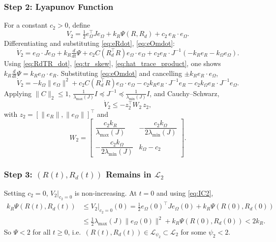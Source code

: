 \documentclass[11pt]{article}
\theoremstyle{remark}
\newcommand{\lmin}{\lambda_{\min}}
\newcommand{\lmax}{\lambda_{\max}}
\begin{document}
\subsubsection*{Step 2: Lyapunov Function}
For a constant $c_2 > 0$, define
\begin{equation}
V_2 = \tfrac{1}{2}e_\Omega^\top J e_\Omega + k_R \Psi(R, R_d) + c_2\, e_R \cdot e_\Omega.
\label{eq:V2}
\end{equation}
Differentiating and substituting \eqref{eq:eRdot}, \eqref{eq:eOmdot}:
\[
\dot V_2 = e_\Omega\cdot J\dot e_\Omega + k_R\tfrac{d}{dt}\Psi + c_2 C(R_d^\top R)e_\Omega\cdot e_\Omega + c_2 e_R \cdot J^{-1}(-k_R e_R - k_\Omega e_\Omega).
\]
Using \eqref{eq:RdTR_dot}, \eqref{eq:tr_skew}, \eqref{eq:hat_trace_product}, one shows $k_R \tfrac{d}{dt}\Psi = k_R e_\Omega\cdot e_R$. Substituting \eqref{eq:eOmdot} and cancelling $\pm k_R e_R\cdot e_\Omega$,
\begin{equation}
\dot V_2 = -k_\Omega\|e_\Omega\|^2 + c_2 C(R_d^\top R)e_\Omega\cdot e_\Omega - c_2 k_R e_R\cdot J^{-1}e_R - c_2 k_\Omega e_R\cdot J^{-1}e_\Omega.
\label{eq:V2dot_exact}
\end{equation}
Applying $\|C\|_2\le 1$, $\tfrac{1}{\lmax(J)}I \preceq J^{-1} \preceq \tfrac{1}{\lmin(J)}I$, and Cauchy--Schwarz,
\begin{equation}
\dot V_2 \le -z_2^\top W_2\, z_2,
\label{eq:V2dot}
\end{equation}
with $z_2 = [\|e_R\|,\|e_\Omega\|]^\top$ and
\[
W_2 = \begin{bmatrix}
    \dfrac{c_2 k_R}{\lmax(J)} & -\dfrac{c_2 k_\Omega}{2\lmin(J)} \\[8pt]
    -\dfrac{c_2 k_\Omega}{2\lmin(J)} & k_\Omega - c_2
\end{bmatrix}.
\]

\subsubsection*{Step 3: $(R(t), R_d(t))$ Remains in $\mathcal{L}_2$}
Setting $c_2 = 0$, $V_2|_{c_2=0}$ is non-increasing. At $t=0$ and using \eqref{eq:IC2},
\begin{align*}
k_R\Psi(R(t), R_d(t))
&\le V_2|_{c_2=0}(0) = \tfrac{1}{2}e_\Omega(0)^\top J e_\Omega(0) + k_R\Psi(R(0),R_d(0))\\
&\le \tfrac{1}{2}\lmax(J)\|e_\Omega(0)\|^2 + k_R\Psi(R(0),R_d(0)) < 2k_R.
\end{align*}
So $\Psi<2$ for all $t\ge 0$, i.e.\ $(R(t),R_d(t)) \in \mathcal{L}_{\psi_2} \subset \mathcal{L}_2$ for some $\psi_2<2$.
\end{document}

